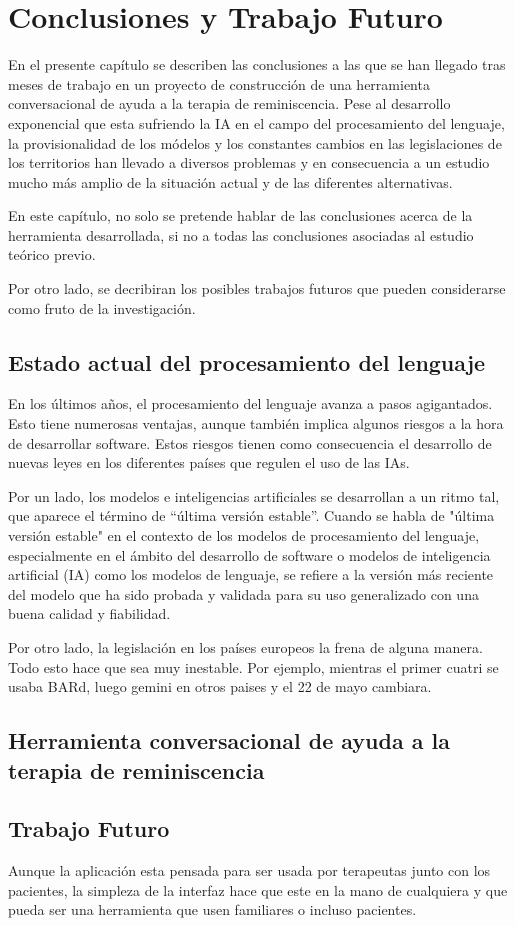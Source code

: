 \chapter{Conclusiones y Trabajo Futuro}
\label{cap:conclusiones}
En el presente capítulo se describen las conclusiones a las que se han llegado tras meses de trabajo en un proyecto de construcción de una herramienta conversacional de ayuda a la terapia de reminiscencia. Pese al desarrollo exponencial que esta sufriendo la IA en el campo del procesamiento del lenguaje, la provisionalidad de los módelos y los constantes cambios en las legislaciones de los territorios han llevado a diversos problemas y en consecuencia a un estudio mucho más amplio de la situación actual y de las diferentes alternativas. 

En este capítulo, no solo se pretende hablar de las conclusiones acerca de la herramienta desarrollada, si no a todas las conclusiones asociadas al estudio teórico previo. 

Por otro lado, se decribiran los posibles trabajos futuros que pueden considerarse como fruto de la investigación.

\section{Estado actual del procesamiento del lenguaje}
En los últimos años, el procesamiento del lenguaje avanza a pasos agigantados. Esto tiene numerosas ventajas, aunque también implica algunos riesgos a la hora de desarrollar software.  Estos riesgos tienen como consecuencia el desarrollo de nuevas leyes en los diferentes países que regulen el uso de las IAs. 

Por un lado, los modelos e inteligencias artificiales se desarrollan a un ritmo tal, que aparece el término de ``última versión estable''. Cuando se habla de "última versión estable" en el contexto de los modelos de procesamiento del lenguaje, especialmente en el ámbito del desarrollo de software o modelos de inteligencia artificial (IA) como los modelos de lenguaje, se refiere a la versión más reciente del modelo que ha sido probada y validada para su uso generalizado con una buena calidad y fiabilidad.

Por otro lado, la legislación en los países europeos la frena de alguna manera. Todo esto hace que sea muy inestable. Por ejemplo, mientras el primer cuatri se usaba BARd, luego gemini en otros paises y el 22 de mayo cambiara. 

\section{Herramienta conversacional de ayuda a la terapia de reminiscencia}

\section{Trabajo Futuro}

Aunque la aplicación esta pensada para ser usada por terapeutas junto con los pacientes, la simpleza de la interfaz hace que este en la mano de cualquiera y que pueda ser una herramienta que usen familiares o incluso pacientes. 